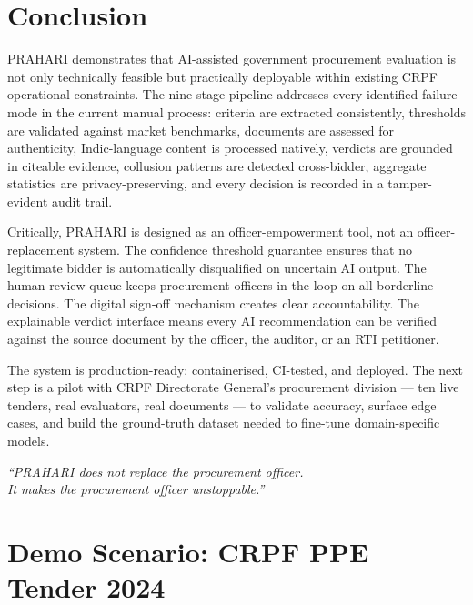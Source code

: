 \documentclass[12pt,a4paper]{article}
\begin{document}
\section{Conclusion}

PRAHARI demonstrates that AI-assisted government procurement evaluation is not only
technically feasible but practically deployable within existing CRPF operational
constraints. The nine-stage pipeline addresses every identified failure mode in the
current manual process: criteria are extracted consistently, thresholds are validated
against market benchmarks, documents are assessed for authenticity, Indic-language
content is processed natively, verdicts are grounded in citeable evidence, collusion
patterns are detected cross-bidder, aggregate statistics are privacy-preserving, and
every decision is recorded in a tamper-evident audit trail.

Critically, PRAHARI is designed as an officer-empowerment tool, not an officer-
replacement system. The confidence threshold guarantee ensures that no legitimate
bidder is automatically disqualified on uncertain AI output. The human review queue
keeps procurement officers in the loop on all borderline decisions. The digital
sign-off mechanism creates clear accountability. The explainable verdict interface
means every AI recommendation can be verified against the source document by the
officer, the auditor, or an RTI petitioner.

The system is production-ready: containerised, CI-tested, and deployed. The next
step is a pilot with CRPF Directorate General's procurement division --- ten live
tenders, real evaluators, real documents --- to validate accuracy, surface edge
cases, and build the ground-truth dataset needed to fine-tune domain-specific models.

\vspace{0.5cm}
\begin{tcolorbox}[colback=noteblue, colframe=noteblueborder, boxrule=0.8pt, arc=4pt]
\centering\itshape
``PRAHARI does not replace the procurement officer. \\
It makes the procurement officer unstoppable.''
\end{tcolorbox}

\newpage
\appendix
\section{Demo Scenario: CRPF PPE Tender 2024}
\end{document}
